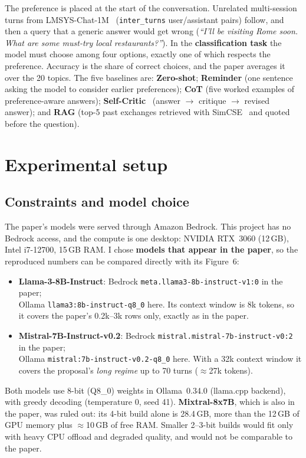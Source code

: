 \documentclass[11pt,a4paper]{article}
\begin{document}
The preference is placed at the start of the conversation. Unrelated multi-session turns from LMSYS-Chat-1M~\cite{lmsys}
(\texttt{inter\_turns} user/assistant pairs) follow, and then a query that a generic answer would get wrong
(\emph{``I'll be visiting Rome soon. What are some must-try local restaurants?''}). In the \textbf{classification task} the
model must choose among four options, exactly one of which respects the preference. Accuracy is the share of correct choices,
and the paper averages it over the 20 topics. The five baselines are:
\textbf{Zero-shot}; \textbf{Reminder} (one sentence asking the model to consider earlier preferences);
\textbf{CoT} (five worked examples of preference-aware answers);
\textbf{Self-Critic}~\cite{huang} (answer $\rightarrow$ critique $\rightarrow$ revised answer); and
\textbf{RAG} (top-5 past exchanges retrieved with SimCSE~\cite{simcse} and quoted before the question).

\section{Experimental setup}

\subsection{Constraints and model choice}
The paper's models were served through Amazon Bedrock. This project has no Bedrock access, and the compute is one
desktop: NVIDIA RTX~3060 (12\,GB), Intel i7-12700, 15\,GB RAM. I chose \textbf{models that appear in the paper}, so
the reproduced numbers can be compared directly with its Figure~6:

\begin{itemize}
  \item \textbf{Llama-3-8B-Instruct}: Bedrock \texttt{meta.llama3-8b-instruct-v1:0} in the paper;\\
        Ollama \texttt{llama3:8b-instruct-q8\_0} here. Its context window is 8k tokens, so it covers the paper's 0.2k--3k rows only, exactly as
        in the paper.
  \item \textbf{Mistral-7B-Instruct-v0.2}: Bedrock \texttt{mistral.mistral-7b-instruct-v0:2} in the paper;\\
        Ollama \texttt{mistral:7b-instruct-v0.2-q8\_0} here. With a 32k context window it covers the proposal's \emph{long regime} up to 70 turns
        ($\approx$27k tokens).
\end{itemize}
Both models use 8-bit (Q8\_0) weights in Ollama~0.34.0 (llama.cpp backend), with greedy decoding (temperature 0, seed 41).
\textbf{Mixtral-8x7B}, which is also in the paper, was ruled out: its 4-bit build alone is 28.4\,GB, more than the 12\,GB of GPU
memory plus $\approx$10\,GB of free RAM. Smaller 2--3-bit builds would fit only with heavy CPU offload and degraded quality, and would
not be comparable to the paper.
\end{document}
